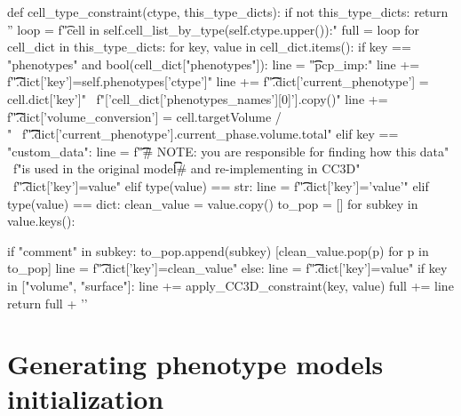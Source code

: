 \begin{python}
def cell_type_constraint(ctype, this_type_dicts):
    if not this_type_dicts:
        return ''
    loop = f"\t\tfor cell in self.cell_list_by_type(self.{ctype.upper()}):\n"
    full = loop
    for cell_dict in this_type_dicts:
        for key, value in cell_dict.items():
            if key == "phenotypes" and bool(cell_dict["phenotypes"]):
                line = "\t\t\tif pcp_imp:\n"
                line += f"\t\t\t\tcell.dict['{key}']=self.phenotypes['{ctype}']\n"
                line += f"\t\t\t\tcell.dict['current_phenotype'] = cell.dict['{key}']" \
                        f"['{cell_dict['phenotypes_names'][0]}'].copy()\n"
                line += f"\t\t\t\tcell.dict['volume_conversion'] = cell.targetVolume / \\\n" \
                    f"\t\t\t\t\tcell.dict['current_phenotype'].current_phase.volume.total\n"
            elif key == "custom_data":
                line = f"\t\t\t# NOTE: you are responsible for finding how this data" \
                       f"is used in the original model\n\t\t\t# and re-implementing in CC3D" \
                       f"\n\t\t\tcell.dict['{key}']={value}\n"
            elif type(value) == str:
                line = f"\t\t\tcell.dict['{key}']='{value}'\n"
            elif type(value) == dict:
                clean_value = value.copy()
                to_pop = []
                for subkey in value.keys():

                    if "comment" in subkey:
                        to_pop.append(subkey)
                [clean_value.pop(p) for p in to_pop]
                line = f"\t\t\tcell.dict['{key}']={clean_value}\n"
            else:
                line = f"\t\t\tcell.dict['{key}']={value}\n"
            if key in ["volume", "surface"]:
                line += apply_CC3D_constraint(key, value)
            full += line
    return full + '\n\n'
\end{python}


\section{Generating phenotype models initialization}\label{code:trans:cc3d:constr-step:pheno}


